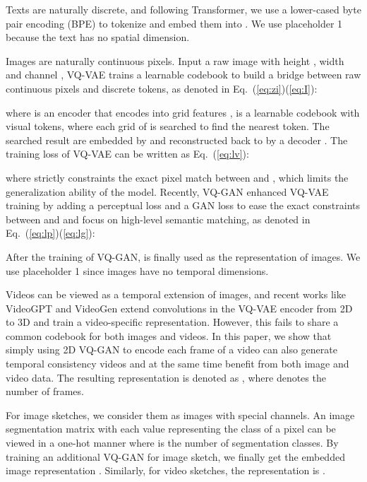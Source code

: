 \documentclass[10pt,twocolumn,letterpaper]{article}
\begin{document}
Texts are naturally discrete, and following Transformer\cite{vaswaniAttentionAllYou2017}, we use a lower-cased byte pair encoding (BPE) to tokenize and embed them into . We use placeholder 1 because the text has no spatial dimension.

Images are naturally continuous pixels. Input a raw image  with height , width  and channel ,  VQ-VAE\cite{oordNeuralDiscreteRepresentation2017} trains a learnable codebook to build a bridge between raw continuous pixels and discrete tokens, as denoted in Eq.~(\ref{eq:zi})(\ref{eq:I}):


where  is an encoder that encodes  into  grid features ,  is a learnable codebook with  visual tokens, where each grid of  is searched to find the nearest token. The searched result  are embedded by  and reconstructed back to  by a decoder . The training loss of VQ-VAE can be written as Eq.~(\ref{eq:lv}):

where  strictly constraints the exact pixel match between  and , which limits the generalization ability of the model. Recently, VQ-GAN\cite{esserTamingTransformersHighResolution2021} enhanced VQ-VAE training by adding a perceptual loss and a GAN loss to ease the exact constraints between  and  and focus on high-level semantic matching, as denoted in Eq.~(\ref{eq:lp})(\ref{eq:lg}):


After the training of VQ-GAN,  is finally used as the representation of images. We use placeholder 1 since images have no temporal dimensions.

Videos can be viewed as a temporal extension of images, and recent works like VideoGPT\cite{yanVideoGPTVideoGeneration2021} and VideoGen\cite{zhangVideoGenGenerativeModeling2020} extend convolutions in the VQ-VAE encoder from 2D to 3D and train a video-specific representation. However, this fails to share a common codebook for both images and videos. In this paper, we show that simply using 2D VQ-GAN to encode each frame of a video can also generate temporal consistency videos and at the same time benefit from both image and video data. The resulting representation is denoted as , where  denotes the number of frames.

For image sketches, we consider them as images with special channels. An image segmentation matrix  with each value representing the class of a pixel can be viewed in a one-hot manner  where  is the number of segmentation classes. By training an additional VQ-GAN for image sketch, we finally get the embedded image representation . Similarly, for video sketches, the representation is . 
\end{document}

